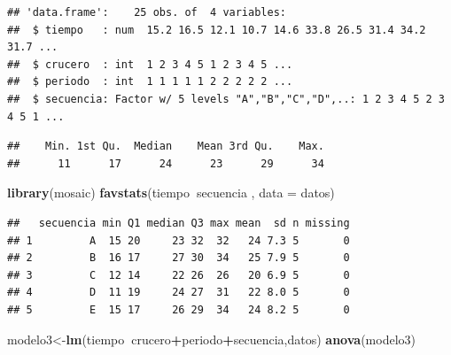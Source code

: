 \documentclass[]{book}
\newenvironment{Shaded}{\begin{snugshade}}{\end{snugshade}}
\newcommand{\KeywordTok}[1]{\textcolor[rgb]{0.13,0.29,0.53}{\textbf{#1}}}
\newcommand{\DataTypeTok}[1]{\textcolor[rgb]{0.13,0.29,0.53}{#1}}
\newcommand{\OperatorTok}[1]{\textcolor[rgb]{0.81,0.36,0.00}{\textbf{#1}}}
\newcommand{\NormalTok}[1]{#1}
\begin{document}
\begin{verbatim}
## 'data.frame':    25 obs. of  4 variables:
##  $ tiempo   : num  15.2 16.5 12.1 10.7 14.6 33.8 26.5 31.4 34.2 31.7 ...
##  $ crucero  : int  1 2 3 4 5 1 2 3 4 5 ...
##  $ periodo  : int  1 1 1 1 1 2 2 2 2 2 ...
##  $ secuencia: Factor w/ 5 levels "A","B","C","D",..: 1 2 3 4 5 2 3 4 5 1 ...
\end{verbatim}

\begin{Shaded}
\end{Shaded}

\begin{verbatim}
##    Min. 1st Qu.  Median    Mean 3rd Qu.    Max. 
##      11      17      24      23      29      34
\end{verbatim}

\begin{Shaded}
\begin{Highlighting}[]
\KeywordTok{library}\NormalTok{(mosaic)}
\KeywordTok{favstats}\NormalTok{(tiempo}\OperatorTok{~}\NormalTok{secuencia , }\DataTypeTok{data =}\NormalTok{ datos)}
\end{Highlighting}
\end{Shaded}

\begin{verbatim}
##   secuencia min Q1 median Q3 max mean  sd n missing
## 1         A  15 20     23 32  32   24 7.3 5       0
## 2         B  16 17     27 30  34   25 7.9 5       0
## 3         C  12 14     22 26  26   20 6.9 5       0
## 4         D  11 19     24 27  31   22 8.0 5       0
## 5         E  15 17     26 29  34   24 8.2 5       0
\end{verbatim}

\begin{Shaded}
\begin{Highlighting}[]
\NormalTok{modelo3<-}\KeywordTok{lm}\NormalTok{(tiempo}\OperatorTok{~}\NormalTok{crucero}\OperatorTok{+}\NormalTok{periodo}\OperatorTok{+}\NormalTok{secuencia,datos)}
\KeywordTok{anova}\NormalTok{(modelo3)}
\end{Highlighting}
\end{Shaded}
\end{document}
